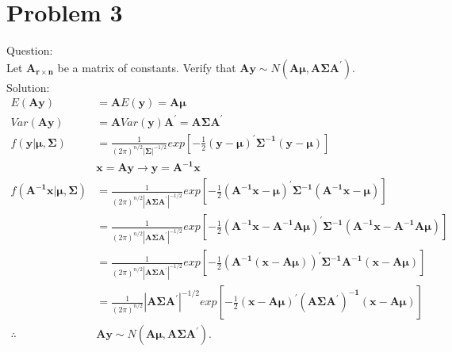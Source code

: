 \documentclass{article}
\begin{document}
         
                   
\section{Problem 3}
Question:\\
Let $\bm{A_{r \times n}}$ be a matrix of constants. Verify that
$\bm{Ay} \sim N(\bm{A\mu},\bm{A\Sigma A^{\prime}})$.\\     
Solution:\\
\begin{align*}
  E(\bm{Ay})&=\bm{A}E(\bm{y})=\bm{A\mu}\\
  Var(\bm{Ay})&=\bm{A}Var(\bm{y})\bm{A^{\prime}}=\bm{A\Sigma A^{\prime}}\\
  f(\bm{y}|\bm{\mu}, \bm{\Sigma})&=\frac{1}{(2\pi)^{n/2}|\bm{\Sigma}|^{-1/2}}exp[-\frac{1}{2}\bm{(y-\mu)^{\prime}\Sigma^{-1}(y-\mu)}]\\
  &\bm{x}=\bm{Ay}\rightarrow \bm{y}=\bm{A^{-1}x}\\
  f(\bm{A^{-1}x}|\bm{\mu}, \bm{\Sigma})&=\frac{1}{(2\pi)^{n/2}|\bm{A\Sigma A^{\prime}}|^{-1/2}}exp[-\frac{1}{2}\bm{(A^{-1}x-\mu)^{\prime}\Sigma^{-1}(A^{-1}x-\mu)}]\\
  &=\frac{1}{(2\pi)^{n/2}|\bm{A\Sigma A^{\prime}}|^{-1/2}}exp[-\frac{1}{2}\bm{(A^{-1}x-A^{-1}A\mu)^{\prime}\Sigma^{-1}(A^{-1}x-A^{-1}A\mu)}]\\
  &=\frac{1}{(2\pi)^{n/2}|\bm{A\Sigma A^{\prime}}|^{-1/2}}exp[-\frac{1}{2}\bm{(A^{-1}(x-A\mu))^{\prime}\Sigma^{-1}A^{-1}(x-A\mu)}]\\
  &=\frac{1}{(2\pi)^{n/2}}|\bm{A\Sigma A^{\prime}}|^{-1/2}exp[-\frac{1}{2}\bm{(x-A\mu)^{\prime}(A\Sigma A^{\prime})^{-1}(x-A\mu)}]\\
  \therefore &\bm{Ay} \sim N(\bm{A\mu},\bm{A\Sigma A^{\prime}})
  .
  \end{align*}
       

         
\end{document}
